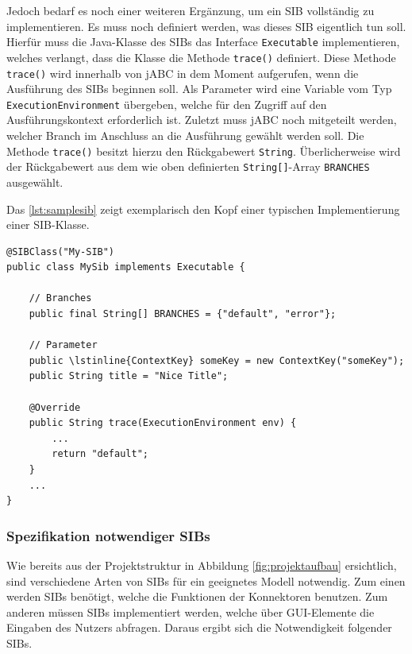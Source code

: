 Jedoch bedarf es noch einer weiteren Ergänzung, um ein SIB vollständig zu implementieren.
Es muss noch definiert werden, was dieses SIB eigentlich tun soll.
Hierfür muss die Java-Klasse des SIBs das Interface \lstinline{Executable} implementieren, welches verlangt,
 dass die Klasse die Methode \lstinline{trace()} definiert. Diese Methode \lstinline{trace()} wird innerhalb von jABC
 in dem Moment aufgerufen, wenn die Ausführung des SIBs beginnen soll.
Als Parameter wird eine Variable vom Typ \lstinline{ExecutionEnvironment} übergeben, welche für den Zugriff auf den
 Ausführungskontext erforderlich ist.
Zuletzt muss jABC noch mitgeteilt werden, welcher Branch im Anschluss an die Ausführung gewählt werden soll.
Die Methode \lstinline{trace()} besitzt hierzu den Rückgabewert \lstinline{String}.
Überlicherweise wird der Rückgabewert aus dem wie oben definierten \lstinline{String[]}-Array \lstinline{BRANCHES} ausgewählt.

Das \autoref{lst:samplesib} zeigt exemplarisch den Kopf einer typischen Implementierung einer SIB-Klasse.

\begin{lstlisting}[float=h!t]
@SIBClass("My-SIB")
public class MySib implements Executable {

	// Branches
    public final String[] BRANCHES = {"default", "error"};

    // Parameter
    public \lstinline{ContextKey} someKey = new ContextKey("someKey");
    public String title = "Nice Title";

    @Override
    public String trace(ExecutionEnvironment env) {
        ...
		return "default";
    }
	...
}
\end{lstlisting}

\FloatBarrier
\subsubsection{Spezifikation notwendiger SIBs}
Wie bereits aus der Projektstruktur in Abbildung \ref{fig:projektaufbau} ersichtlich, sind verschiedene Arten von SIBs
 für ein geeignetes Modell notwendig.
Zum einen werden SIBs benötigt, welche die Funktionen der Konnektoren benutzen.
Zum anderen müssen SIBs implementiert werden, welche über GUI-Elemente die Eingaben des Nutzers abfragen.
Daraus ergibt sich die Notwendigkeit folgender SIBs.

